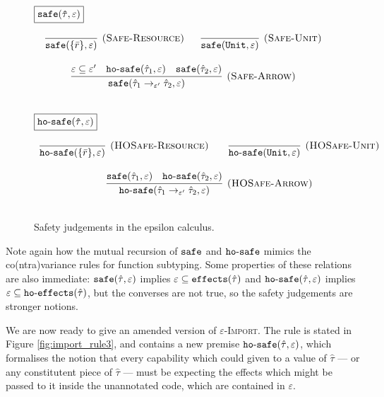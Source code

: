 \begin{figure}[h]

\noindent
$\fbox{$\mathtt{safe(\hat \tau, \varepsilon)}$}$

\[
\begin{array}{c}

\infer[\textsc{(Safe-Resource)}]
	{\kwa{safe}(\{ \bar r \}, \varepsilon)}
	{}
~~~~~
\infer[\textsc{(Safe-Unit)}]
	{\kwa{safe}(\kwa{Unit}, \varepsilon)}
	{} \\[3ex]

\infer[\textsc{(Safe-Arrow)}]
	{\kwa{safe}(\hat \tau_1 \rightarrow_{\varepsilon'} \hat \tau_2, \varepsilon)}
	{\varepsilon \subseteq \varepsilon' & \kwa{ho \hyphen safe}(\hat \tau_1, \varepsilon) & \kwa{safe}(\hat \tau_2, \varepsilon)} \\[3ex]

\end{array}
\]

\noindent
$\fbox{$\mathtt{ho \hbox{-} safe(\hat \tau, \varepsilon)}$}$

\[
\begin{array}{c}

\infer[\textsc{(HOSafe-Resource)}]
	{ \kwa{ho \hyphen safe}( \{ \bar r \}, \varepsilon)} 
	{}
	~~~~~~
\infer[\textsc{(HOSafe-Unit)}]
	{ \kwa{ho \hyphen safe}( \kwa{Unit}, \varepsilon)} 
	{}\\[3ex]

\infer[\textsc{(HOSafe-Arrow)}]
	{ \kwa{ho \hyphen safe}( \hat \tau_1 \rightarrow_{\varepsilon'} \hat \tau_2, \varepsilon ) }
	{ \kwa{safe}(\hat \tau_1, \varepsilon)  & \kwa{ho \hyphen safe}(\hat \tau_2, \varepsilon) }\\[3ex]

\end{array}
\]

\vspace{-7pt}
\caption{Safety judgements in the epsilon calculus.}
\label{fig:safe_defns}
\end{figure}

Note again how the mutual recursion of $\mathtt{safe}$ and $\mathtt{ho \hbox{-} safe}$ mimics the co(ntra)variance rules for function subtyping. Some properties of these relations are also immediate: $\mathtt{safe}(\hat \tau, \varepsilon)$ implies $\varepsilon \subseteq \mathtt{effects}(\hat \tau)$ and $\mathtt{ho \hbox{-} safe}(\hat \tau, \varepsilon)$ implies $\varepsilon \subseteq \mathtt{ho \hbox{-} effects}(\hat \tau)$, but the converses are not true, so the safety judgements are stronger notions.

We are now ready to give an amended version of \textsc{$\varepsilon$-Import}. The rule is stated in Figure \ref{fig:import_rule3}, and contains a new premise $\mathtt{ho \hbox{-} safe}(\hat \tau, \varepsilon)$, which formalises the notion that every capability which could given to a value of $\hat \tau$ --- or any constitutent piece of $\hat \tau$ --- must be expecting the effects which might be passed to it inside the unannotated code, which are contained in $\varepsilon$.

